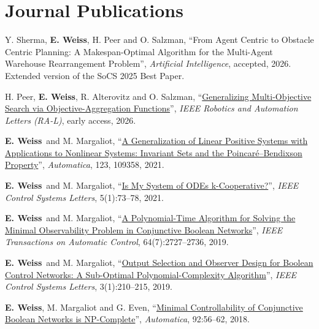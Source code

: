 \documentclass[10pt,letterpaper]{article}
\let\origsection\section
\renewcommand{\section}[1]{\Needspace*{5\baselineskip}\origsection{#1}}
\newcommand{\me}{\textbf{E. Weiss}}
\begin{document}
\section{Journal Publications}
\begin{pubs}
  \item Y. Sherma, \me, H. Peer and O. Salzman, ``From Agent Centric to Obstacle Centric Planning: A Makespan-Optimal Algorithm for the Multi-Agent Warehouse Rearrangement Problem'', \emph{Artificial Intelligence}, accepted, 2026. Extended version of the SoCS 2025 Best Paper.
  \item H. Peer, \me, R. Alterovitz and O. Salzman, ``\href{https://doi.org/10.1109/LRA.2026.3741789}{Generalizing Multi-Objective Search via Objective-Aggregation Functions}'', \emph{IEEE Robotics and Automation Letters (RA-L)}, early access, 2026.
  \item \me\ and M. Margaliot, ``\href{https://doi.org/10.1016/j.automatica.2020.109358}{A Generalization of Linear Positive Systems with Applications to Nonlinear Systems: Invariant Sets and the Poincar\'e--Bendixson Property}'', \emph{Automatica}, 123, 109358, 2021.
  \item \me\ and M. Margaliot, ``\href{https://doi.org/10.1109/LCSYS.2020.2999870}{Is My System of ODEs k-Cooperative?}'', \emph{IEEE Control Systems Letters}, 5(1):73--78, 2021.
  \item \me\ and M. Margaliot, ``\href{https://doi.org/10.1109/TAC.2018.2882154}{A Polynomial-Time Algorithm for Solving the Minimal Observability Problem in Conjunctive Boolean Networks}'', \emph{IEEE Transactions on Automatic Control}, 64(7):2727--2736, 2019.
  \item \me\ and M. Margaliot, ``\href{https://doi.org/10.1109/LCSYS.2018.2872295}{Output Selection and Observer Design for Boolean Control Networks: A Sub-Optimal Polynomial-Complexity Algorithm}'', \emph{IEEE Control Systems Letters}, 3(1):210--215, 2019.
  \item \me, M. Margaliot and G. Even, ``\href{https://doi.org/10.1016/j.automatica.2018.02.014}{Minimal Controllability of Conjunctive Boolean Networks is NP-Complete}'', \emph{Automatica}, 92:56--62, 2018.
\end{pubs}
\end{document}
